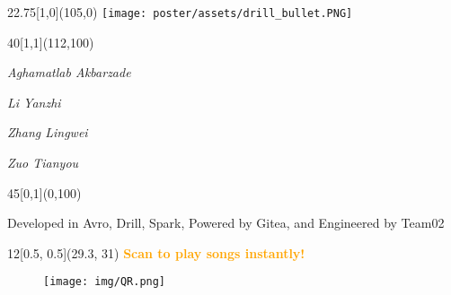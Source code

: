 \documentclass{beamer}
\begin{document}
%
%


%
%

\begin{textblock}{22.75}[1,0](105,0)
	\logos[light]\qquad\texttt{[image: poster/assets/drill\_bullet.PNG]}
\end{textblock}

\newcommand{\printAuthor}[1]{{\em #1}}
\begin{textblock}{40}[1,1](112,100)
	\begin{tcbraster}[raster equal height,raster column skip=0cm,raster columns=2,raster rows=2, raster row skip=0.5cm]
	\begin{blankbox}[fontupper=\LARGE,colupper=white]
        \printAuthor{Aghamatlab Akbarzade}
        \end{blankbox}
	\begin{blankbox}[fontupper=\LARGE,colupper=white]
            \printAuthor{Li Yanzhi}
        \end{blankbox}
	\begin{blankbox}[fontupper=\LARGE,colupper=white]
            \printAuthor{Zhang Lingwei}
        \end{blankbox}
        \begin{blankbox}[fontupper=\LARGE,colupper=white]
            \printAuthor{Zuo Tianyou}
        \end{blankbox}
	\end{tcbraster}
\end{textblock}

\begin{textblock}{45}[0,1](0,100)
	\begin{blankbox}[fontupper=\LARGE,colupper=white]
		Developed in Avro, Drill, Spark, Powered by Gitea, and Engineered by Team02 %
	\end{blankbox}
\end{textblock}

%
%

\begin{textblock}{12}[0.5, 0.5](29.3, 31)
\centering
{\Huge \textcolor{orange}{\textbf{Scan to play songs instantly!}}}
\begin{figure}
    \centering
    \texttt{[image: img/QR.png]}
\end{figure}
\end{textblock}
\end{document}
